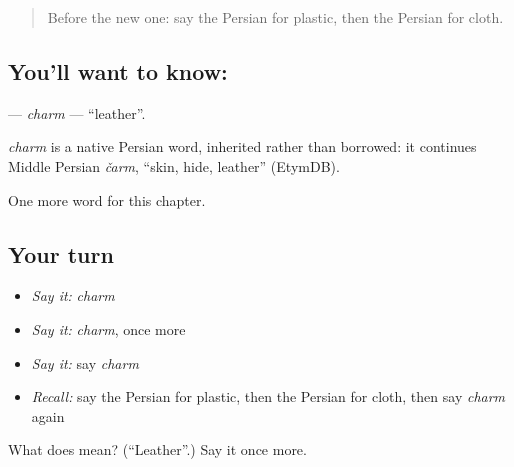 \label{lesson:FA-C173-charm}



\begin{quote}
Before the new one: say the Persian for plastic, then the Persian for cloth.
\end{quote}

\subsection*{You'll want to know: }
\textbf{} — \emph{charm} — \textquotedblleft{}leather\textquotedblright{}.

\begin{cousinweb}
\emph{charm} is a native Persian word, inherited rather than borrowed: it continues Middle Persian \emph{čarm}, \textquotedblleft{}skin, hide, leather\textquotedblright{} (EtymDB).
\end{cousinweb}

\begin{grammarlens}[title={What you've built}]
One more word for this chapter.
\end{grammarlens}

\subsection*{Your turn}
\begin{itemize}
\raggedright
  \item \emph{Say it:} \emph{charm}
  \item \emph{Say it:} \emph{charm}, once more
  \item \emph{Say it:} say \emph{charm}
  \item \emph{Recall:} say the Persian for plastic, then the Persian for cloth, then say \emph{charm} again
\end{itemize}

\begin{tcolorbox}[breakable,colback=teal!4,colframe=teal!35!black,title={Before you move on}]
What does  mean? (\textquotedblleft{}Leather\textquotedblright{}.) Say it once more.
\end{tcolorbox}
